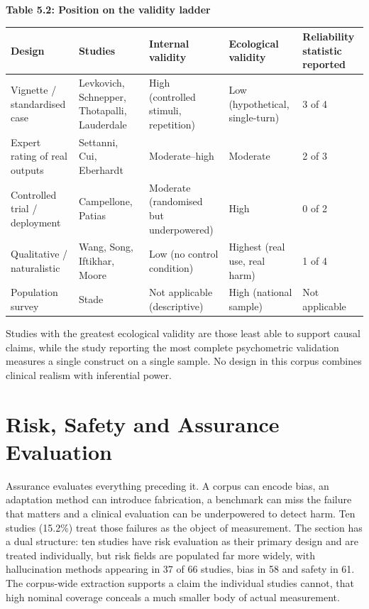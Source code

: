 \documentclass[11pt]{article}
\begin{document}
	\begin{center}
		\textbf{Table 5.2: Position on the validity ladder}
		\vspace{2pt}
		
		\footnotesize
		\setlength{\tabcolsep}{3pt}\renewcommand{\arraystretch}{1.1}
		\begin{tabularx}{\textwidth}{|X|X|X|X|X|}
			\hline
			\textbf{Design} & \textbf{Studies} & \textbf{Internal validity} & \textbf{Ecological validity} & \textbf{Reliability statistic reported} \\
			\hline
			Vignette / standardised case & Levkovich, Schnepper, Thotapalli, Lauderdale & High (controlled stimuli, repetition) & Low (hypothetical, single-turn) & 3 of 4 \\
			\hline
			Expert rating of real outputs & Settanni, Cui, Eberhardt & Moderate--high & Moderate & 2 of 3 \\
			\hline
			Controlled trial / deployment & Campellone, Patias & Moderate (randomised but underpowered) & High & 0 of 2 \\
			\hline
			Qualitative / naturalistic & Wang, Song, Iftikhar, Moore & Low (no control condition) & Highest (real use, real harm) & 1 of 4 \\
			\hline
			Population survey & Stade & Not applicable (descriptive) & High (national sample) & Not applicable \\
			\hline
		\end{tabularx}
	\end{center}
	
	Studies with the greatest ecological validity are those least able to support causal claims, while the study reporting the most complete psychometric validation measures a single construct on a single sample. No design in this corpus combines clinical realism with inferential power.
	
	\section{Risk, Safety and Assurance Evaluation}
	
	Assurance evaluates everything preceding it. A corpus can encode bias, an adaptation method can introduce fabrication, a benchmark can miss the failure that matters and a clinical evaluation can be underpowered to detect harm. Ten studies (15.2\%) treat those failures as the object of measurement. The section has a dual structure: ten studies have risk evaluation as their primary design and are treated individually, but risk fields are populated far more widely, with hallucination methods appearing in 37 of 66 studies, bias in 58 and safety in 61. The corpus-wide extraction supports a claim the individual studies cannot, that high nominal coverage conceals a much smaller body of actual measurement.
	
\end{document}
